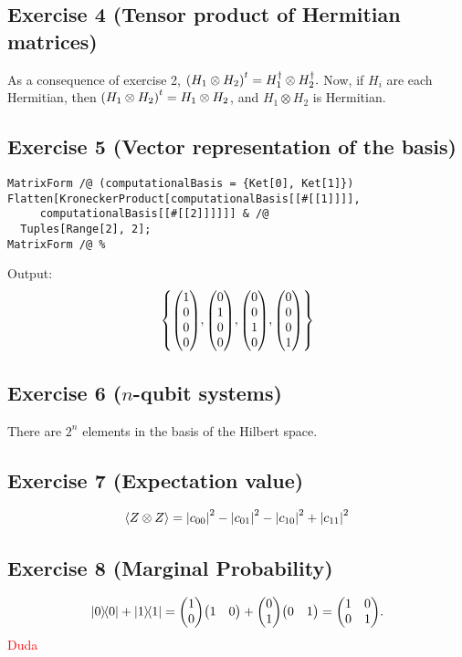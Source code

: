 \subsection{Exercise 4 (Tensor product of Hermitian matrices)}
As a consequence of exercise 2,
$\qty(H_1\otimes H_2)^t=H_1^{\dagger}\otimes H_2^{\dagger}.$
Now, if $H_i$ are each Hermitian, then $\qty(H_1\otimes H_2)^t
=H_1\otimes H_2$, and $H_1\otimes H_2$ is Hermitian.

\subsection{Exercise 5 (Vector representation of the basis)}
\begin{verbatim}
MatrixForm /@ (computationalBasis = {Ket[0], Ket[1]})
Flatten[KroneckerProduct[computationalBasis[[#[[1]]]], 
     computationalBasis[[#[[2]]]]]] & /@
  Tuples[Range[2], 2];
MatrixForm /@ %
\end{verbatim}
Output:
\begin{align}
\qty{\mqty(1\\0\\0\\0),\mqty(0\\1\\0\\0),\mqty(0\\0\\1\\0),\mqty(0\\0\\0\\1)}
\end{align}

\subsection{Exercise 6 ($n$-qubit systems)}\noindent
There are $2^n$ elements in the basis of the Hilbert space.

\subsection{Exercise 7 (Expectation value)}
\begin{align}
\expval{Z\otimes Z}=\abs{c_{00}}^2-\abs{c_{01}}^2-\abs{c_{10}}^2+\abs{c_{11}}^2
\end{align}

\subsection{Exercise 8 (Marginal Probability)}
\begin{align}
\dyad{0}{0}+\dyad{1}{1}=\mqty(1\\0)\mqty(1&0)+\mqty(0\\1)\mqty(0&1)
=\mqty(1&0\\0&1).
\end{align}
\textcolor{red}{Duda}

